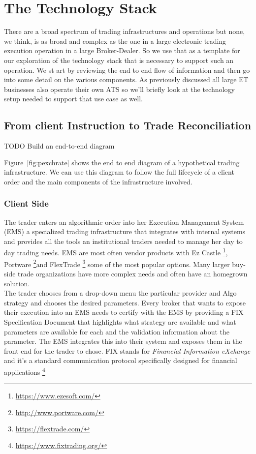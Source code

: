 
\chapter{The Technology Stack}
There are a broad spectrum of trading infrastructures and operations but none, we think, is as broad and complex as the one in a large electronic trading execution operation in a large Broker-Dealer. So we use that as a template for our exploration of the technology stack that is necessary to support such an operation. We st  art by reviewing the end to end flow of information and then go into some detail on the various components. As previously discussed all large ET businesses also operate their own ATS so we'll briefly look at the technology setup needed to support that use case as well.\\

\section{From client Instruction to Trade Reconciliation}
TODO Build an end-to-end diagram

Figure~\ref{fig:pexchrate} shows the end to end diagram of a hypothetical trading infrastructure. We can use this diagram to follow the full lifecycle of a client order and the main components of the infrastructure involved.
\subsection{Client Side}
The trader enters an algorithmic order into her Execution Management System (EMS) a specialized trading infrastructure that integrates with internal systems and provides all the tools an institutional traders needed to manage her day to day trading needs. EMS are most often vendor products with Ez Castle \footnote{\url{https://www.ezesoft.com/}}, Portware \footnote{\url{http://www.portware.com/}}and FlexTrade \footnote{\url{https://flextrade.com/}} some of the most popular options. Many larger buy-side trade organizations have more complex needs and often have an homegrown solution.\\

The trader chooses from a drop-down menu the particular provider and Algo strategy and  chooses the desired parameters. Every broker that wants to expose their execution into an EMS needs to certify with the EMS by providing a FIX Specification Document that highlights what strategy are available and what parameters are available for each and the validation information about the parameter. The EMS integrates this into their system and exposes them in the front end for the trader to chose. FIX stands for \emph{Financial Information eXchange} and it's a standard communication protocol specifically designed for financial applications \footnote{\url{https://www.fixtrading.org/}}\\

